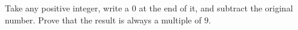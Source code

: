 Take any positive integer, write a $0$ at the end of it, and subtract the original number. Prove that the result is always a multiple of $9$.
